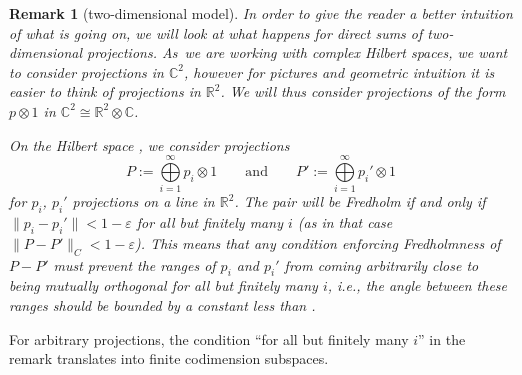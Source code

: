 \documentclass[10pt,a4paper]{amsart}
\numberwithin{equation}{section}
\newtheorem{Remark}[Theorem]{Remark} }
\begin{document}
	\begin{Remark}[two-dimensional model]
In order to give the reader a better intuition of what is going on, we will look at what happens for direct sums of two-dimensional projections. As~we are working with complex Hilbert spaces, we want to consider projections in $\mathbb{C}^2$, however for pictures and geometric intuition it is easier to think of projections in $\mathbb{R}^2$. We will thus consider projections of the form $p\otimes 1$ in $\mathbb{C}^2\cong \mathbb{R}^2\otimes \mathbb{C}$.

		On the Hilbert space , we consider projections
\[
P:=\bigoplus\limits_{i=1}^\infty p_i\otimes 1
\qquad \text{and}\qquad
P':=\bigoplus\limits_{i=1}^\infty p_i'\otimes 1
\]
for $p_i$, $p_i'$ projections on a line in $\mathbb{R}^2$. The pair will be Fredholm if and only if
$
\bigl\|p_i-p_i'\bigr\|<1-\varepsilon$
for all but finitely many $i$ (as in that case $\|P-P'\|_C<1-\varepsilon$).		
		This means that any condition enforcing Fredholmness of $P-P'$ must prevent the ranges of $p_i$ and $p_i'$ from coming arbitrarily close to being mutually orthogonal for all but finitely many $i$, i.e., the angle  between these ranges should be bounded by a constant less than .
	\end{Remark}
\medskip
	For arbitrary projections, the condition ``for all but finitely many $i$'' in the remark translates into finite codimension subspaces.
	
\end{document}
